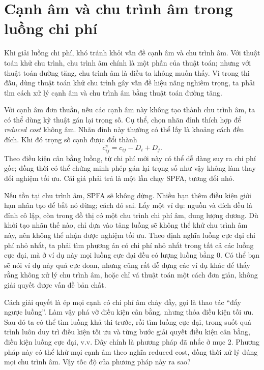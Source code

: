 \documentclass[11pt]{article}
\begin{document}
\section{Cạnh âm và chu trình âm trong luồng chi phí}

Khi giải luồng chi phí, khó tránh khỏi vấn đề cạnh âm và chu trình âm. Với
thuật toán khử chu trình, chu trình âm chính là một phần của thuật toán; nhưng
với thuật toán đường tăng, chu trình âm là điều ta không muốn thấy. Vì trong
thi đấu, dùng thuật toán khử chu trình gây vấn đề hiệu năng nghiêm trọng, ta
phải tìm cách xử lý cạnh âm và chu trình âm bằng thuật toán đường tăng.

Với cạnh âm đơn thuần, nếu các cạnh âm này không tạo thành chu trình âm, ta có
thể dùng kỹ thuật gán lại trọng số. Cụ thể, chọn nhãn đỉnh thích hợp để
\textit{reduced cost} không âm. Nhãn đỉnh này thường có thể lấy là khoảng cách
đến đích. Khi đó trọng số cạnh được đổi thành
\[
  c^\pi_{ij}=c_{ij}-D_i+D_j.
\]
Theo điều kiện cân bằng luồng, từ chi phí mới này có thể dễ dàng suy ra chi
phí gốc; đồng thời có thể chứng minh phép gán lại trọng số như vậy không làm
thay đổi nghiệm tối ưu. Cái giá phải trả là một lần chạy SPFA, tương đối nhỏ.

Nếu tồn tại chu trình âm, SPFA sẽ không dừng. Nhiều bạn thêm điều kiện giới
hạn nhân tạo để bắt nó dừng; cách đó sai. Lấy một ví dụ: nguồn và đích đều là
đỉnh cô lập, còn trong đồ thị có một chu trình chi phí âm, dung lượng dương.
Dù khởi tạo nhãn thế nào, chỉ dựa vào tăng luồng sẽ không thể khử chu trình âm
này, nên không thể nhận được nghiệm tối ưu. Theo định nghĩa luồng cực đại chi
phí nhỏ nhất, ta phải tìm phương án có chi phí nhỏ nhất trong tất cả các luồng
cực đại, mà ở ví dụ này mọi luồng cực đại đều có lượng luồng bằng $0$. Có thể
bạn sẽ nói ví dụ này quá cực đoan, nhưng cũng rất dễ dựng các ví dụ khác để
thấy rằng không xử lý chu trình âm, hoặc chỉ vá thuật toán một cách đơn giản,
không giải quyết được vấn đề bản chất.

Cách giải quyết là ép mọi cạnh có chi phí âm chảy đầy, gọi là thao tác ``đẩy
ngược luồng''. Làm vậy phá vỡ điều kiện cân bằng, nhưng thỏa điều kiện tối ưu.
Sau đó ta có thể tìm luồng khả thi trước, rồi tìm luồng cực đại, trong suốt
quá trình luôn duy trì điều kiện tối ưu và từng bước giải quyết điều kiện cân
bằng, điều kiện luồng cực đại, v.v. Đây chính là phương pháp đã nhắc ở mục 2.
Phương pháp này có thể khử mọi cạnh âm theo nghĩa reduced cost, đồng thời xử
lý đúng mọi chu trình âm. Vậy tốc độ của phương pháp này ra sao?
\end{document}
